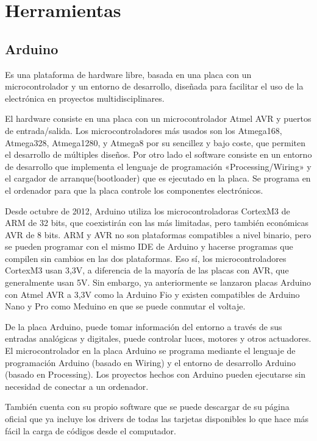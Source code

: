 \chapter{Herramientas}
\section{Arduino}

Es una plataforma de hardware libre, basada en una placa con un microcontrolador
y un entorno de desarrollo, diseñada para facilitar el uso de la electrónica en
proyectos multidisciplinares.

El hardware consiste en una placa con un microcontrolador Atmel AVR y puertos de
entrada/salida. Los microcontroladores más usados son los Atmega168, Atmega328,
Atmega1280, y Atmega8 por su sencillez y bajo coste, que permiten el desarrollo
de múltiples diseños. Por otro lado el software consiste en un entorno de
desarrollo que implementa el lenguaje de programación «Processing/Wiring» y el
cargador de arranque(bootloader) que es ejecutado en la placa. Se programa en el
ordenador para que la placa controle los componentes electrónicos.

Desde octubre de 2012, Arduino utiliza los microcontroladoras CortexM3 de ARM de
32 bits, que coexistirán con las más limitadas, pero también económicas AVR de 8
bits. ARM y AVR no son plataformas compatibles a nivel binario, pero se pueden
programar con el mismo IDE de Arduino y hacerse programas que compilen sin
cambios en las dos plataformas. Eso sí, los microcontroladores CortexM3 usan
3,3V, a diferencia de la mayoría de las placas con AVR, que generalmente usan
5V. Sin embargo, ya anteriormente se lanzaron placas Arduino con Atmel AVR a
3,3V como la Arduino Fio y existen compatibles de Arduino Nano y Pro como
Meduino en que se puede conmutar el voltaje.

De la placa Arduino, puede tomar información del entorno a través de sus
entradas analógicas y digitales, puede controlar luces, motores y otros
actuadores. El microcontrolador en la placa Arduino se programa mediante el
lenguaje de programación Arduino (basado en Wiring) y el entorno de desarrollo
Arduino (basado en Processing). Los proyectos hechos con Arduino pueden
ejecutarse sin necesidad de conectar a un ordenador.

También cuenta con su propio software que se puede descargar de su página
oficial que ya incluye los drivers de todas las tarjetas disponibles lo que hace
más fácil la carga de códigos desde el computador.

